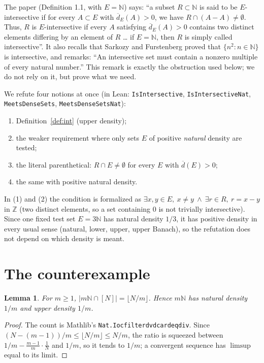 \documentclass[11pt]{article}
\newtheorem{lemma}[theorem]{Lemma}
\theoremstyle{definition}
\theoremstyle{remark}
\renewcommand{\_}{\oldus\allowbreak}
\newcommand{\N}{\mathbb{N}}
\newcommand{\Z}{\mathbb{Z}}
\newcommand{\dbar}{\overline{d}}
\begin{document}
\noindent The paper (Definition 1.1, with $E=\N$) says: ``a subset $R\subset\N$ is said to be
$E$-intersective if for every $A\subset E$ with $\dbar_E(A)>0$, we have $R\cap(A-A)\neq\emptyset$.
Thus, $R$ is $E$-intersective if every $A$ satisfying $\dbar_E(A)>0$ contains two distinct elements
differing by an element of $R$ \dots{} if $E=\N$, then $R$ is simply called intersective''. It also recalls that Sarkozy and Furstenberg proved that
$\{n^2:n\in\N\}$ is intersective, and remarks: ``An intersective set must contain a nonzero multiple of every
natural number.'' This remark is exactly the obstruction used below; we do not rely on it, but prove what we
need.

We refute four notions at once (in Lean: \texttt{IsIntersective}, \texttt{IsIntersectiveNat},
\texttt{MeetsDenseSets}, \texttt{MeetsDenseSetsNat}):
\begin{enumerate}[label=(\arabic*)]
  \item Definition~\ref{def:int} (upper density);
  \item the weaker requirement where only sets $E$ of positive \emph{natural} density are tested;
  \item the literal parenthetical: $R\cap E\neq\emptyset$ for every $E$ with $\dbar(E)>0$;
  \item the same with positive natural density.
\end{enumerate}
In (1) and (2) the condition is formalized as $\exists x,y\in E,\ x\ne y\ \wedge\ \exists r\in R,\
r=x-y$ in $\Z$ (two distinct elements, so a set containing $0$ is not trivially intersective). Since one fixed test set $E=3\N$ has natural density $1/3$, it has positive density in
every usual sense (natural, lower, upper, upper Banach), so the refutation does not depend on which density
is meant.

\section{The counterexample}

\begin{lemma}\label{lem:dens}
For $m\ge1$, $|m\N\cap[N]|=\lfloor N/m\rfloor$. Hence $m\N$ has natural density $1/m$ and upper density $1/m$.
\end{lemma}

\begin{proof}
The count is Mathlib's \texttt{Nat.Ioc\_filter\_dvd\_card\_eq\_div}. Since
$(N-(m-1))/m\le\lfloor N/m\rfloor\le N/m$, the ratio is squeezed between $1/m-\frac{m-1}{m}\cdot\frac1N$
and $1/m$, so it tends to $1/m$; a convergent sequence has $\limsup$ equal to its limit.
\end{proof}
\end{document}
